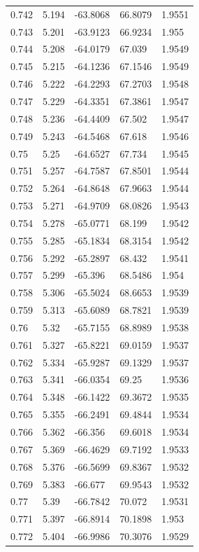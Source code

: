 \begin{tabular}{lllll}
0.742 & 5.194 & -63.8068 & 66.8079 & 1.9551 \\
0.743 & 5.201 & -63.9123 & 66.9234 & 1.955 \\
0.744 & 5.208 & -64.0179 & 67.039 & 1.9549 \\
0.745 & 5.215 & -64.1236 & 67.1546 & 1.9549 \\
0.746 & 5.222 & -64.2293 & 67.2703 & 1.9548 \\
0.747 & 5.229 & -64.3351 & 67.3861 & 1.9547 \\
0.748 & 5.236 & -64.4409 & 67.502 & 1.9547 \\
0.749 & 5.243 & -64.5468 & 67.618 & 1.9546 \\
0.75 & 5.25 & -64.6527 & 67.734 & 1.9545 \\
0.751 & 5.257 & -64.7587 & 67.8501 & 1.9544 \\
0.752 & 5.264 & -64.8648 & 67.9663 & 1.9544 \\
0.753 & 5.271 & -64.9709 & 68.0826 & 1.9543 \\
0.754 & 5.278 & -65.0771 & 68.199 & 1.9542 \\
0.755 & 5.285 & -65.1834 & 68.3154 & 1.9542 \\
0.756 & 5.292 & -65.2897 & 68.432 & 1.9541 \\
0.757 & 5.299 & -65.396 & 68.5486 & 1.954 \\
0.758 & 5.306 & -65.5024 & 68.6653 & 1.9539 \\
0.759 & 5.313 & -65.6089 & 68.7821 & 1.9539 \\
0.76 & 5.32 & -65.7155 & 68.8989 & 1.9538 \\
0.761 & 5.327 & -65.8221 & 69.0159 & 1.9537 \\
0.762 & 5.334 & -65.9287 & 69.1329 & 1.9537 \\
0.763 & 5.341 & -66.0354 & 69.25 & 1.9536 \\
0.764 & 5.348 & -66.1422 & 69.3672 & 1.9535 \\
0.765 & 5.355 & -66.2491 & 69.4844 & 1.9534 \\
0.766 & 5.362 & -66.356 & 69.6018 & 1.9534 \\
0.767 & 5.369 & -66.4629 & 69.7192 & 1.9533 \\
0.768 & 5.376 & -66.5699 & 69.8367 & 1.9532 \\
0.769 & 5.383 & -66.677 & 69.9543 & 1.9532 \\
0.77 & 5.39 & -66.7842 & 70.072 & 1.9531 \\
0.771 & 5.397 & -66.8914 & 70.1898 & 1.953 \\
0.772 & 5.404 & -66.9986 & 70.3076 & 1.9529 \\

\end{tabular}
